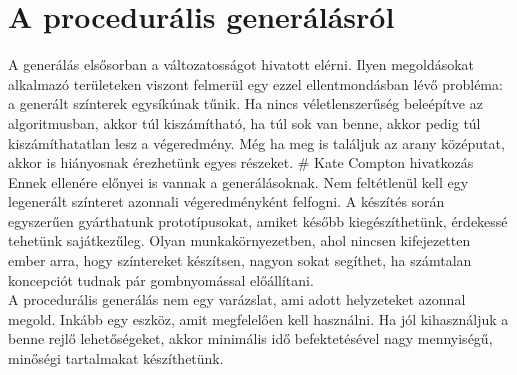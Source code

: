 \section{A procedurális generálásról}
A generálás elsősorban a változatosságot hivatott elérni. Ilyen megoldásokat alkalmazó területeken
viszont felmerül egy ezzel ellentmondásban lévő probléma: a generált színterek egysíkúnak tűnik. Ha
nincs véletlenszerűség beleépítve az algoritmusban, akkor túl kiszámítható, ha túl sok van benne,
akkor pedig túl kiszámíthatatlan lesz a végeredmény. Még ha meg is találjuk az arany középutat,
akkor is hiányosnak érezhetünk egyes részeket. \# Kate Compton hivatkozás\\
Ennek ellenére előnyei is vannak a generálásoknak. Nem feltétlenül kell egy legenerált színteret
azonnali végeredményként felfogni. A készítés során egyszerűen gyárthatunk prototípusokat, amiket
később kiegészíthetünk, érdekessé tehetünk sajátkezűleg. Olyan munkakörnyezetben, ahol nincsen
kifejezetten ember arra, hogy színtereket készítsen, nagyon sokat segíthet, ha számtalan koncepciót
tudnak pár gombnyomással előállítani.\\
A procedurális generálás nem egy varázslat, ami adott helyzeteket azonnal megold. Inkább egy
eszköz, amit megfelelően kell használni. Ha jól kihasználjuk a benne rejlő lehetőségeket, akkor
minimális idő befektetésével nagy mennyiségű, minőségi tartalmakat készíthetünk.